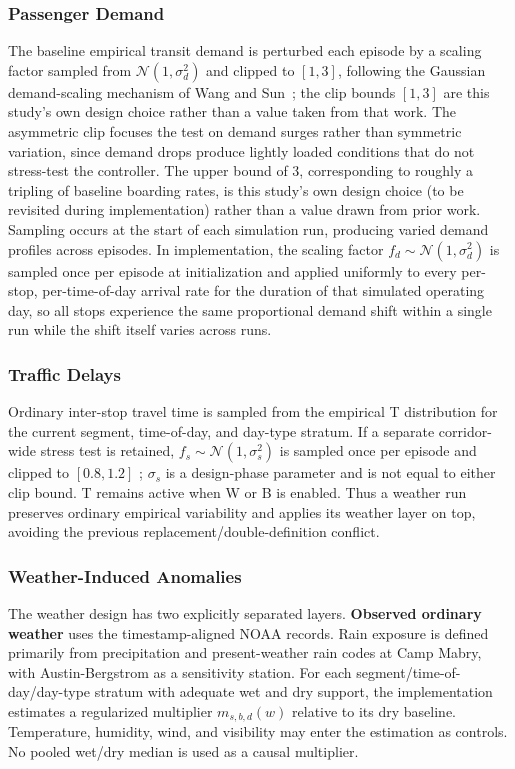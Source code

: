 \subsubsection{Passenger Demand}

The baseline empirical transit demand is perturbed each episode by a scaling factor sampled from $\mathcal{N}(1, \sigma_d^2)$ and clipped to $[1, 3]$, following the Gaussian demand-scaling mechanism of Wang and Sun~\cite{Wangsun}; the clip bounds $[1,3]$ are this study's own design choice rather than a value taken from that work. The asymmetric clip focuses the test on demand surges rather than symmetric variation, since demand drops produce lightly loaded conditions that do not stress-test the controller. The upper bound of 3, corresponding to roughly a tripling of baseline boarding rates, is this study's own design choice (to be revisited during implementation) rather than a value drawn from prior work. Sampling occurs at the start of each simulation run, producing varied demand profiles across episodes. In implementation, the scaling factor $f_d \sim \mathcal{N}(1, \sigma_d^2)$ is sampled once per episode at initialization and applied uniformly to every per-stop, per-time-of-day arrival rate for the duration of that simulated operating day, so all stops experience the same proportional demand shift within a single run while the shift itself varies across runs.

\subsubsection{Traffic Delays}

Ordinary inter-stop travel time is sampled from the empirical T distribution for the current segment, time-of-day, and day-type stratum. If a separate corridor-wide stress test is retained, $f_s \sim \mathcal{N}(1,\sigma_s^2)$ is sampled once per episode and clipped to $[0.8,1.2]$ \cite{Wangsun}; $\sigma_s$ is a design-phase parameter and is not equal to either clip bound. T remains active when W or B is enabled. Thus a weather run preserves ordinary empirical variability and applies its weather layer on top, avoiding the previous replacement/double-definition conflict.

\subsubsection{Weather-Induced Anomalies}

The weather design has two explicitly separated layers. \textbf{Observed ordinary weather} uses the timestamp-aligned NOAA records. Rain exposure is defined primarily from precipitation and present-weather rain codes at Camp Mabry, with Austin-Bergstrom as a sensitivity station. For each segment/time-of-day/day-type stratum with adequate wet and dry support, the implementation estimates a regularized multiplier $m_{s,b,d}(w)$ relative to its dry baseline. Temperature, humidity, wind, and visibility may enter the estimation as controls. No pooled wet/dry median is used as a causal multiplier.

